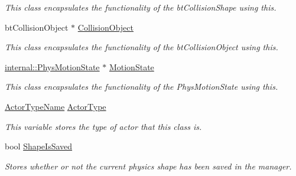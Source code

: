 \begin{DoxyCompactItemize}
\begin{DoxyCompactList}\small\item\em This class encapsulates the functionality of the btCollisionShape using this. \item\end{DoxyCompactList}\item 
\hypertarget{classphys_1_1ActorBase_a70676c52ffee64705a7b463d29b60429}{
btCollisionObject $\ast$ \hyperlink{classphys_1_1ActorBase_a70676c52ffee64705a7b463d29b60429}{CollisionObject}}
\label{d8/d0f/classphys_1_1ActorBase_a70676c52ffee64705a7b463d29b60429}

\begin{DoxyCompactList}\small\item\em This class encapsulates the functionality of the btCollisionObject using this. \item\end{DoxyCompactList}\item 
\hypertarget{classphys_1_1ActorBase_ab776527aa927b8787313c50530cc24ba}{
\hyperlink{classphys_1_1internal_1_1PhysMotionState}{internal::PhysMotionState} $\ast$ \hyperlink{classphys_1_1ActorBase_ab776527aa927b8787313c50530cc24ba}{MotionState}}
\label{d8/d0f/classphys_1_1ActorBase_ab776527aa927b8787313c50530cc24ba}

\begin{DoxyCompactList}\small\item\em This class encapsulates the functionality of the PhysMotionState using this. \item\end{DoxyCompactList}\item 
\hypertarget{classphys_1_1ActorBase_a42baa3657656300eeefe3ed48f526a00}{
\hyperlink{classphys_1_1ActorBase_aff3a7c464e8ce82576073f8f891434b7}{ActorTypeName} \hyperlink{classphys_1_1ActorBase_a42baa3657656300eeefe3ed48f526a00}{ActorType}}
\label{d8/d0f/classphys_1_1ActorBase_a42baa3657656300eeefe3ed48f526a00}

\begin{DoxyCompactList}\small\item\em This variable stores the type of actor that this class is. \item\end{DoxyCompactList}\item 
\hypertarget{classphys_1_1ActorBase_a22c0ab01bdc3e1e5c656fb0f201f6929}{
bool \hyperlink{classphys_1_1ActorBase_a22c0ab01bdc3e1e5c656fb0f201f6929}{ShapeIsSaved}}
\label{d8/d0f/classphys_1_1ActorBase_a22c0ab01bdc3e1e5c656fb0f201f6929}

\begin{DoxyCompactList}\small\item\em Stores whether or not the current physics shape has been saved in the manager. \item\end{DoxyCompactList}\end{DoxyCompactItemize}
